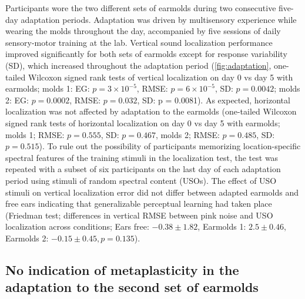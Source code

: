 Participants wore the two different sets of earmolds during two consecutive five-day adaptation periods. Adaptation was driven by multisensory experience while wearing the molds throughout the day, accompanied by five sessions of daily sensory-motor training at the lab. Vertical sound localization performance improved significantly for both sets of earmolds except for response variability (SD), which increased throughout the adaptation period (\cref{fig:adaptation}, one-tailed Wilcoxon signed rank tests of vertical localization on day 0 vs day 5 with earmolds; molds 1: EG: $p = 3 \times 10^{-5}$, RMSE: $p = 6 \times 10^{-5}$, SD: $p = 0.0042$; molds 2: EG: $p = 0.0002$, RMSE: $p = 0.032$, SD: p = 0.0081). As expected, horizontal localization was not affected by adaptation to the earmolds (one-tailed Wilcoxon signed rank tests of horizontal localization on day 0 vs day 5 with earmolds; molds 1; RMSE: $p = 0.555$, SD: $p = 0.467$, molds 2; RMSE: $p = 0.485$, SD: $p = 0.515$). %
To rule out the possibility of participants memorizing location-specific spectral features of the training stimuli in the localization test, the test was repeated with a subset of six participants on the last day of each adaptation period using stimuli of random spectral content (USOs). The effect of USO stimuli on vertical localization error did not differ between adapted earmolds and free ears indicating that generalizable perceptual learning had taken place (Friedman test; differences in vertical RMSE between pink noise and USO localization across conditions; Ears free: $-0.38 \pm 1.82$, Earmolds 1: $2.5 \pm 0.46$, Earmolds 2: $-0.15 \pm 0.45, p = 0.135$).

\subsection{No indication of metaplasticity in the adaptation to the second set of earmolds}

